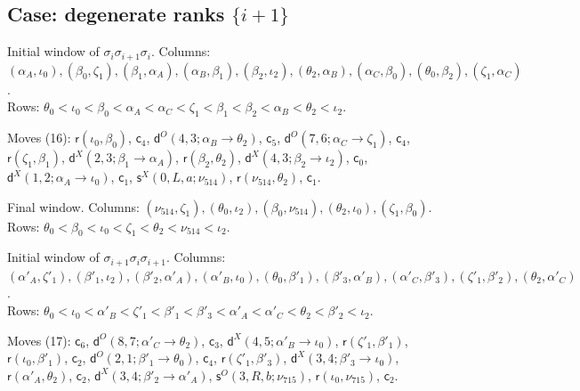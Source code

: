 \documentclass[11pt]{amsart}
\theoremstyle{definition}
\theoremstyle{remark}
\begin{document}
\subsection*{Case: degenerate ranks \texorpdfstring{$\{i+1\}$}{i+1}}
\noindent Initial window of $\sigma_i\sigma_{i+1}\sigma_i$. Columns: $(\alpha_A,\iota_0),\allowbreak (\beta_0,\zeta_1),\allowbreak (\beta_1,\alpha_A),\allowbreak (\alpha_B,\beta_1),\allowbreak (\beta_2,\iota_2),\allowbreak (\theta_2,\alpha_B),\allowbreak (\alpha_C,\beta_0),\allowbreak (\theta_0,\beta_2),\allowbreak (\zeta_1,\alpha_C)$.\\ Rows: $\theta_0 <\allowbreak \iota_0 <\allowbreak \beta_0 <\allowbreak \alpha_A <\allowbreak \alpha_C <\allowbreak \zeta_1 <\allowbreak \beta_1 <\allowbreak \beta_2 <\allowbreak \alpha_B <\allowbreak \theta_2 <\allowbreak \iota_2$.\par
\noindent Moves (16): $\mathsf{r}(\iota_0,\beta_0)$, $\mathsf{c}_{4}$, $\mathsf{d}^{O}(4,3;\alpha_B\to\theta_2)$, $\mathsf{c}_{5}$, $\mathsf{d}^{O}(7,6;\alpha_C\to\zeta_1)$, $\mathsf{c}_{4}$, $\mathsf{r}(\zeta_1,\beta_1)$, $\mathsf{d}^{X}(2,3;\beta_1\to\alpha_A)$, $\mathsf{r}(\beta_2,\theta_2)$, $\mathsf{d}^{X}(4,3;\beta_2\to\iota_2)$, $\mathsf{c}_{0}$, $\mathsf{d}^{X}(1,2;\alpha_A\to\iota_0)$, $\mathsf{c}_{1}$, $\mathsf{s}^{X}(0,L,a;\nu_{514})$, $\mathsf{r}(\nu_{514},\theta_2)$, $\mathsf{c}_{1}$.\par
\noindent Final window. Columns: $(\nu_{514},\zeta_1),\allowbreak (\theta_0,\iota_2),\allowbreak (\beta_0,\nu_{514}),\allowbreak (\theta_2,\iota_0),\allowbreak (\zeta_1,\beta_0)$.\\ Rows: $\theta_0 <\allowbreak \beta_0 <\allowbreak \iota_0 <\allowbreak \zeta_1 <\allowbreak \theta_2 <\allowbreak \nu_{514} <\allowbreak \iota_2$.\par\medskip
\noindent Initial window of $\sigma_{i+1}\sigma_i\sigma_{i+1}$. Columns: $(\alpha'_A,\zeta'_1),\allowbreak (\beta'_1,\iota_2),\allowbreak (\beta'_2,\alpha'_A),\allowbreak (\alpha'_B,\iota_0),\allowbreak (\theta_0,\beta'_1),\allowbreak (\beta'_3,\alpha'_B),\allowbreak (\alpha'_C,\beta'_3),\allowbreak (\zeta'_1,\beta'_2),\allowbreak (\theta_2,\alpha'_C)$.\\ Rows: $\theta_0 <\allowbreak \iota_0 <\allowbreak \alpha'_B <\allowbreak \zeta'_1 <\allowbreak \beta'_1 <\allowbreak \beta'_3 <\allowbreak \alpha'_A <\allowbreak \alpha'_C <\allowbreak \theta_2 <\allowbreak \beta'_2 <\allowbreak \iota_2$.\par
\noindent Moves (17): $\mathsf{c}_{6}$, $\mathsf{d}^{O}(8,7;\alpha'_C\to\theta_2)$, $\mathsf{c}_{3}$, $\mathsf{d}^{X}(4,5;\alpha'_B\to\iota_0)$, $\mathsf{r}(\zeta'_1,\beta'_1)$, $\mathsf{r}(\iota_0,\beta'_1)$, $\mathsf{c}_{2}$, $\mathsf{d}^{O}(2,1;\beta'_1\to\theta_0)$, $\mathsf{c}_{4}$, $\mathsf{r}(\zeta'_1,\beta'_3)$, $\mathsf{d}^{X}(3,4;\beta'_3\to\iota_0)$, $\mathsf{r}(\alpha'_A,\theta_2)$, $\mathsf{c}_{2}$, $\mathsf{d}^{X}(3,4;\beta'_2\to\alpha'_A)$, $\mathsf{s}^{O}(3,R,b;\nu_{715})$, $\mathsf{r}(\iota_0,\nu_{715})$, $\mathsf{c}_{2}$.\par
\end{document}
